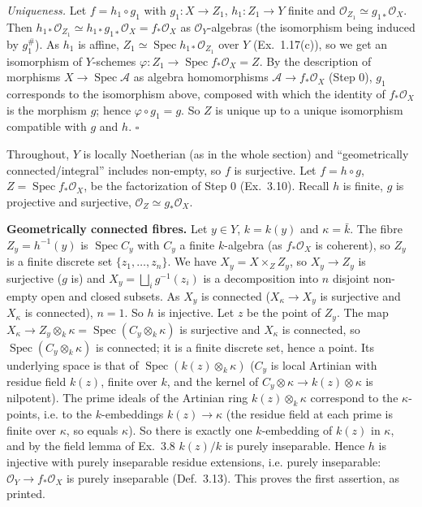 \documentclass[11pt]{article}
\begin{document}
\emph{Uniqueness.} Let $f=h_1\circ g_1$ with $g_1:X\to Z_1$, $h_1:Z_1\to Y$ finite and $\mathcal O_{Z_1}\simeq g_{1*}\mathcal O_X$. Then $h_{1*}\mathcal O_{Z_1}\simeq h_{1*}g_{1*}\mathcal O_X=f_*\mathcal O_X$ as $\mathcal O_Y$-algebras (the isomorphism being induced by $g_1^\#$). As $h_1$ is affine, $Z_1\simeq\operatorname{Spec}h_{1*}\mathcal O_{Z_1}$ over $Y$ (Ex.~1.17(c)), so we get an isomorphism of $Y$-schemes $\varphi:Z_1\to\operatorname{Spec}f_*\mathcal O_X=Z$. By the description of morphisms $X\to\operatorname{Spec}\mathcal A$ as algebra homomorphisms $\mathcal A\to f_*\mathcal O_X$ (Step 0), $g_1$ corresponds to the isomorphism above, composed with which the identity of $f_*\mathcal O_X$ is the morphism $g$; hence $\varphi\circ g_1=g$. So $Z$ is unique up to a unique isomorphism compatible with $g$ and $h$. \hfill$\square$

\pf
Throughout, $Y$ is locally Noetherian (as in the whole section) and ``geometrically connected/integral'' includes non-empty, so $f$ is surjective. Let $f=h\circ g$, $Z=\operatorname{Spec}f_*\mathcal O_X$, be the factorization of Step 0 (Ex.~3.10). Recall $h$ is finite, $g$ is projective and surjective, $\mathcal O_Z\simeq g_*\mathcal O_X$.

\textbf{Geometrically connected fibres.} Let $y\in Y$, $k=k(y)$ and $\kappa=\bar k$. The fibre $Z_y=h^{-1}(y)$ is $\operatorname{Spec}C_y$ with $C_y$ a finite $k$-algebra (as $f_*\mathcal O_X$ is coherent), so $Z_y$ is a finite discrete set $\{z_1,\dots,z_n\}$. We have $X_y=X\times_ZZ_y$, so $X_y\to Z_y$ is surjective ($g$ is) and $X_y=\bigsqcup_ig^{-1}(z_i)$ is a decomposition into $n$ disjoint non-empty open and closed subsets. As $X_y$ is connected ($X_\kappa\to X_y$ is surjective and $X_\kappa$ is connected), $n=1$. So $h$ is injective. Let $z$ be the point of $Z_y$. The map $X_\kappa\to Z_y\otimes_k\kappa=\operatorname{Spec}(C_y\otimes_k\kappa)$ is surjective and $X_\kappa$ is connected, so $\operatorname{Spec}(C_y\otimes_k\kappa)$ is connected; it is a finite discrete set, hence a point. Its underlying space is that of $\operatorname{Spec}(k(z)\otimes_k\kappa)$ ($C_y$ is local Artinian with residue field $k(z)$, finite over $k$, and the kernel of $C_y\otimes\kappa\to k(z)\otimes\kappa$ is nilpotent). The prime ideals of the Artinian ring $k(z)\otimes_k\kappa$ correspond to the $\kappa$-points, i.e. to the $k$-embeddings $k(z)\to\kappa$ (the residue field at each prime is finite over $\kappa$, so equals $\kappa$). So there is exactly one $k$-embedding of $k(z)$ in $\kappa$, and by the field lemma of Ex.~3.8 $k(z)/k$ is purely inseparable. Hence $h$ is injective with purely inseparable residue extensions, i.e. purely inseparable: $\mathcal O_Y\to f_*\mathcal O_X$ is purely inseparable (Def.~3.13). This proves the first assertion, as printed.
\end{document}
